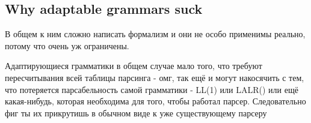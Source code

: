 \subsection{Why adaptable grammars suck}
В общем к ним сложно написать формализм и они не особо применимы реально, потому что очень уж ограничены.

Адаптирующиеся грамматики в общем случае мало того, что требуют пересчитывания всей таблицы парсинга - омг, так ещё и могут накосячить с тем, что потеряется парсабельность самой грамматики - LL(1) или LALR() или ещё какая-нибудь, которая необходима для того, чтобы работал парсер. Следовательно фиг ты их прикрутишь в обычном виде к уже существующему парсеру \cite{Christiansen:SurveyAdaptableGrammars}
